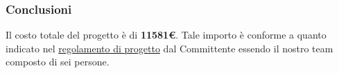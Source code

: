 		\newpage
		
		\subsubsection{Conclusioni}
		Il costo totale del progetto è di \textbf{11581\euro}. Tale importo è conforme a quanto indicato nel \href{http://www.math.unipd.it/~tullio/IS-1/2015/Progetto/}{regolamento di progetto} dal Committente essendo il nostro team composto di sei persone. 
	
	
